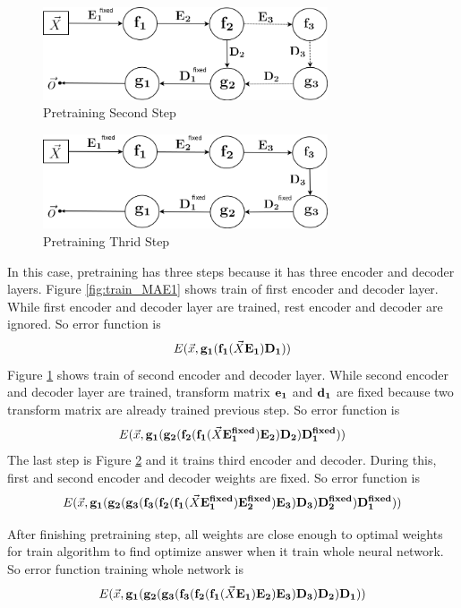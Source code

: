 \documentclass[draft,dvipsnames]{drexel-thesis}
\begin{document}
\begin{thesis}
\begin{figure}[t!]
    \centering
    \includegraphics[width=0.75\textwidth]{pictures/figures/train_MAE2.png}
    \caption{Pretraining Second Step}
    \label{fig:train_MAE2}
\end{figure}

\begin{figure}[t!]
    \centering
    \includegraphics[width=0.75\textwidth]{pictures/figures/train_MAE3.png}
    \caption{Pretraining Thrid Step}
    \label{fig:train_MAE3}
\end{figure}

	In this case, pretraining has three steps because it has three encoder and decoder layers. Figure \ref{fig:train_MAE1} shows train of first encoder and decoder layer. While first encoder and decoder layer are trained, rest encoder and decoder are ignored. So error function is
$$E(\vec{x}, \bold{g_1}(\bold{f_1}(\vec{X}\bold{E_1})\bold{D_1}))$$
Figure \ref{fig:train_MAE2} shows train of second encoder and decoder layer. While second encoder and decoder layer are trained, transform matrix $\bold{e_1}$ and $\bold{d_1}$ are fixed because two transform matrix are already trained previous step. So error function is
$$E(\vec{x}, \bold{g_1}(\bold{g_2}(\bold{f_2}(\bold{f_1}(\vec{X}\bold{E_1^{fixed}})\bold{E_2})\bold{D_2})\bold{D_1^{fixed}}))$$
The last step is Figure \ref{fig:train_MAE3} and it trains third encoder and decoder. During this, first and second encoder and decoder weights are fixed. So error function is
$$E(\vec{x}, \bold{g_1}(\bold{g_2}(\bold{g_3}(\bold{f_3}(\bold{f_2}(\bold{f_1}(\vec{X}\bold{E_1^{fixed}})\bold{E_2^{fixed}})\bold{E_3})\bold{D_3})\bold{D_2^{fixed}})\bold{D_1^{fixed}}))$$

	After finishing pretraining step, all weights are close enough to optimal weights for train algorithm to find optimize answer when it train whole neural network. So error function training whole network is
$$E(\vec{x}, \bold{g_1}(\bold{g_2}(\bold{g_3}(\bold{f_3}(\bold{f_2}(\bold{f_1}(\vec{X}\bold{E_1})\bold{E_2})\bold{E_3})\bold{D_3})\bold{D_2})\bold{D_1}))$$



\end{thesis}
\end{document}
